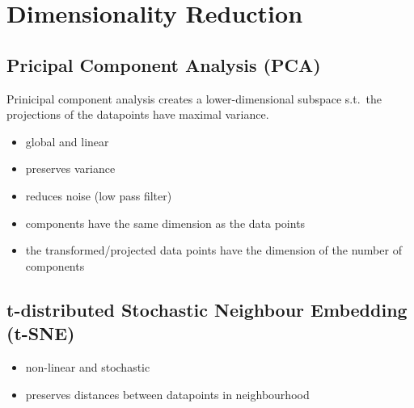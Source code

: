 \section{Dimensionality Reduction}

\subsection{Pricipal Component Analysis (PCA)}
Prinicipal component analysis creates a lower-dimensional subspace s.t.\ the projections of the datapoints have maximal variance.

\newpar{}
\begin{itemize}
    \item global and linear
    \item preserves variance
    \item reduces noise (low pass filter)
    \item components have the same dimension as the data points
    \item the transformed/projected data points have the dimension of the number of components
\end{itemize}

\newpar{}

\subsection{t-distributed Stochastic Neighbour Embedding (t-SNE)}
\begin{itemize}
    \item non-linear and stochastic
    \item preserves distances between datapoints in neighbourhood
\end{itemize}
